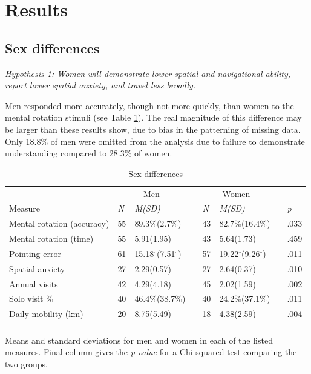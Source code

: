 \section{Results}
\label{sec:3}
	\subsection{Sex differences}
	\label{sec:3.1}
	
\emph{Hypothesis 1: Women will demonstrate lower spatial and navigational ability, report lower spatial anxiety, and travel less broadly.}	
\smallskip

Men responded more accurately, though not more quickly, than women to the mental rotation stimuli (see Table \ref{tab:sex}).  The real magnitude of this difference may be larger than these results show, due to bias in the patterning of missing data.  Only 18.8\% of men were omitted from the analysis due to failure to demonstrate understanding compared to 28.3\% of women.

\begin{table}[h!]
\caption{Sex differences}
\label{tab:sex}  
\begin{tabular}{llllllll}
\hline\noalign{\smallskip}
& \multicolumn{2}{c}{Men} && \multicolumn{2}{c}{Women} && \\
Measure & \emph{N} & \emph{M(SD)} && \emph{N} & \emph{M(SD)} && \emph{p} \\
\noalign{\smallskip}\hline\noalign{\smallskip}
Mental rotation (accuracy) & 55 & 89.3\%(2.7\%) && 43 & 82.7\%(16.4\%) && .033 \\
Mental rotation (time) & 55 & 5.91(1.95) && 43 & 5.64(1.73) && .459 \\
Pointing error & 61 & 15.18$^{\circ}$(7.51$^{\circ}$) && 57 & 19.22$^{\circ}$(9.26$^{\circ}$) && .011 \\
Spatial anxiety & 27 & 2.29(0.57) && 27 & 2.64(0.37) && .010 \\
Annual visits & 42 & 4.29(4.18) && 45 & 2.02(1.59) && .002 \\
Solo visit \% & 40 & 46.4\%(38.7\%) && 40 & 24.2\%(37.1\%) && .011 \\
Daily mobility (km) & 20 & 8.75(5.49) && 18 & 4.38(2.59) && .004 \\
\noalign{\smallskip}\hline
\end{tabular}\par
\bigskip
Means and standard deviations for men and women in each of the listed measures. Final column gives the \emph{p-value} for a Chi-squared test comparing the two groups. 
\end{table}		  

